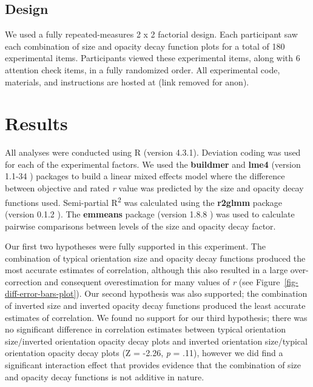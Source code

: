 \documentclass[manuscript, review, anonymous, screen]{acmart}
\begin{document}
\hypertarget{sec-design}{%
\subsection{Design}\label{sec-design}}

We used a fully repeated-measures 2 x 2 factorial design. Each
participant saw each combination of size and opacity decay function
plots for a total of 180 experimental items. Participants viewed these
experimental items, along with 6 attention check items, in a fully
randomized order. All experimental code, materials, and instructions are
hosted at (link removed for anon).

\hypertarget{sec-results}{%
\section{Results}\label{sec-results}}

All analyses were conducted using R (version 4.3.1). Deviation coding
was used for each of the experimental factors. We used the
\textbf{buildmer} and \textbf{lme4} (version 1.1-34 \citep{lme4})
packages to build a linear mixed effects model where the difference
between objective and rated \emph{r} value was predicted by the size and
opacity decay functions used. Semi-partial R\textsuperscript{2} was
calculated using the \textbf{r2glmm} package (version 0.1.2
\citep{r2glmm}). The \textbf{emmeans} package (version 1.8.8
\citep{emmeans}) was used to calculate pairwise comparisons between
levels of the size and opacity decay factor.

Our first two hypotheses were fully supported in this experiment. The
combination of typical orientation size and opacity decay functions
produced the most accurate estimates of correlation, although this also
resulted in a large over-correction and consequent overestimation for
many values of \emph{r} (see Figure~\ref{fig-diff-error-bars-plot}). Our
second hypothesis was also supported; the combination of inverted size
and inverted opacity decay functions produced the least accurate
estimates of correlation. We found no support for our third hypothesis;
there was no significant difference in correlation estimates between
typical orientation size/inverted orientation opacity decay plots and
inverted orientation size/typical orientation opacity decay plots (Z =
-2.26, \emph{p} = .11), however we did find a significant interaction
effect that provides evidence that the combination of size and opacity
decay functions is not additive in nature.
\end{document}
